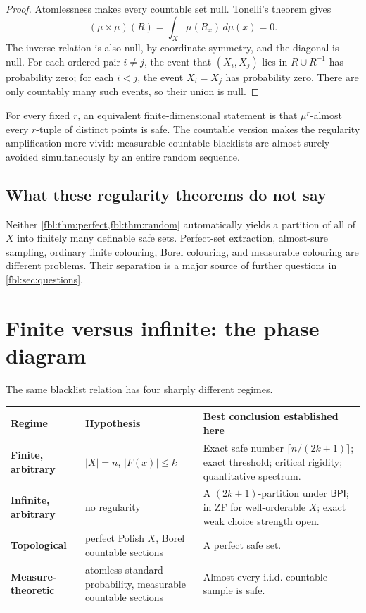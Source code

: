 \documentclass[11pt]{article}
\theoremstyle{definition}
\theoremstyle{remark}
\newcommand{\BPI}{\mathsf{BPI}}
\begin{document}
\begin{proof}
Atomlessness makes every countable set null.  Tonelli's theorem gives
\[
  (\mu\times\mu)(R)
  =\int_X \mu(R_x)\,d\mu(x)=0.
\]
The inverse relation is also null, by coordinate symmetry, and the diagonal
is null.  For each ordered pair $i\ne j$, the event that
$(X_i,X_j)$ lies in $R\cup R^{-1}$ has probability zero; for each
$i<j$, the event $X_i=X_j$ has probability zero.  There are only countably
many such events, so their union is null.
\end{proof}

For every fixed $r$, an equivalent finite-dimensional statement is that
$\mu^r$-almost every $r$-tuple of distinct points is safe.  The countable
version makes the regularity amplification more vivid: measurable
countable blacklists are almost surely avoided simultaneously by an entire
random sequence.

\subsection{What these regularity theorems do not say}
Neither \cref{fbl:thm:perfect,fbl:thm:random} automatically yields a partition of
all of $X$ into finitely many definable safe sets.  Perfect-set extraction,
almost-sure sampling, ordinary finite colouring, Borel colouring, and
measurable colouring are different problems.  Their separation is a major
source of further questions in \cref{fbl:sec:questions}.

\section{Finite versus infinite: the phase diagram}

The same blacklist relation has four sharply different regimes.

\begin{center}
\begin{tabularx}{0.96\textwidth}{>{\bfseries}p{}p{}X}
Regime & Hypothesis & Best conclusion established here\\ \toprule
Finite, arbitrary & $|X|=n$, $|F(x)|\le k$ &
Exact safe number $\lceil n/(2k+1)\rceil$; exact threshold; critical rigidity;
quantitative spectrum.\\
Infinite, arbitrary & no regularity &
A $(2k+1)$-partition under $\BPI$; in ZF for well-orderable $X$; exact weak
choice strength open.\\
Topological & perfect Polish $X$, Borel countable sections &
A perfect safe set.\\
Measure-theoretic & atomless standard probability, measurable countable
sections & Almost every i.i.d. countable sample is safe.\\
\bottomrule
\end{tabularx}
\end{center}
\end{document}
